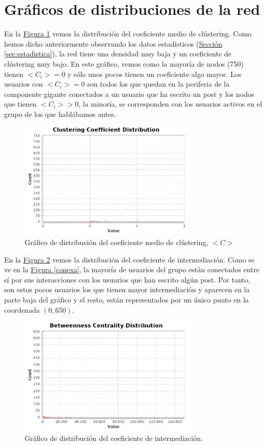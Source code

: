 \documentclass[10pt,a4paper,spanish]{article}
\numberwithin{equation}{section} %
\numberwithin{figure}{section} %
\numberwithin{table}{section} %
\begin{document}
\section{Gráficos de distribuciones de la red}

En la \hyperref[coeficientemedioclustering]{Figura \ref*{coeficientemedioclustering}} vemos la distribución del coeficiente medio de clústering. Como hemos dicho anteriormente observando los datos estadísticos (\hyperref[sec:estadistica]{Sección \ref*{sec:estadistica}}), la red tiene una densidad muy baja y un coeficiente de clústering muy bajo. En este gráfico, vemos como la mayoría de nodos (750) tienen $<C_i> = 0$ y sólo unos pocos tienen un coeficiente algo mayor. Los usuarios con $<C_i> = 0$ son todos los que quedan en la periferia de la componente gigante conectados a un usuario que ha escrito un post y los nodos que tienen $<C_i> > 0$, la minoría, se corresponden con los usuarios activos en el grupo de los que hablábamos antes. 

\begin{figure}[!h]
    \centering
    \includegraphics[width=0.75\textwidth]{../coeficiente_medio_clustering/clustering-coefficient}
    \caption{Gráfico de distribución del coeficiente medio de clústering, $<C>$}
    \label{coeficientemedioclustering}
\end{figure}

En la \hyperref[intermediacion]{Figura \ref*{intermediacion}} vemos la distribución del coeficiente de intermediación. Como se ve en la \hyperref[conexa]{Figura \ref*{conexa}}, la mayoría de usuarios del grupo están conectados entre sí por sus interacciones con los usuarios que han escrito algún post. Por tanto, son estos pocos usuarios los que tienen mayor intermediación y aparecen en la parte baja del gráfico y el resto, están representados por un único punto en la coordenada $(0,650)$.

\begin{figure}[!h]
    \centering
    \includegraphics[width=0.75\textwidth]{../diametro_red/Betweenness-Centrality-Distribution}
    \caption{Gráfico de distribución del coeficiente de intermediación.}
    \label{intermediacion}
\end{figure}
\end{document}
